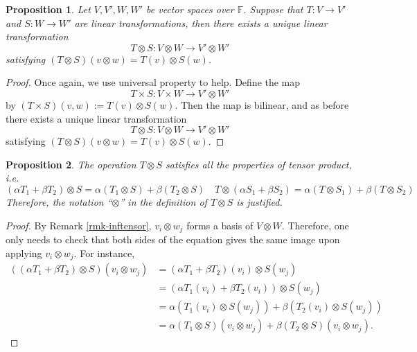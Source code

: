 \documentclass[11pt,openany]{book}
\theoremstyle{plain}
\newtheorem{proposition}[proposition]{Proposition}
\theoremstyle{definition}
\theoremstyle{remark}
\begin{document}
\begin{proposition} 
Let $V, V', W, W'$ be vector spaces over $\mathbb{F}$. Suppose that $T : V \to V'$ and $S : W \to W'$ are linear transformations, then there exists a unique linear transformation
$$T \otimes  S : V \otimes W \to V' \otimes W'$$
satisfying $(T \otimes  S)(v \otimes  w) = T(v) \otimes  S(w)$. 
\end{proposition}
\begin{proof} 
Once again, we use universal property to help. Define the map
$$T \times  S : V \times W \to V' \otimes W'$$
by $(T \times  S)(v,w) := T(v) \otimes  S(w)$.
Then the map is bilinear, and as before there exists a unique linear transformation
$$T \otimes S : V\otimes W \to V' \otimes W'$$
satisfying $(T \otimes  S)(v \otimes  w) = T(v) \otimes  S(w)$.
\end{proof}

\begin{proposition} The operation $T \otimes S$ satisfies all the properties of tensor product, i.e.
$$(\alpha T_1 + \beta T_2) \otimes  S = \alpha(T_1 \otimes  S) + \beta(T_2 \otimes  S) \quad  
T \otimes  (\alpha S_1 + \beta S_2) = \alpha(T \otimes  S_1) + \beta (T \otimes  S_2)$$
Therefore, the notation “$\otimes$” in the definition of $T \otimes  S$ is justified.
\end{proposition}
\begin{proof}
By Remark \ref{rmk-inftensor}, $v_i \otimes w_j$ forms a basis of $V \otimes W$. Therefore, one only needs to check that both sides of the equation gives the same image upon applying $v_i \otimes w_j$. For instance,
\begin{align*}
((\alpha T_1 + \beta T_2) \otimes  S)(v_i \otimes w_j) &= 
(\alpha T_1 + \beta T_2)(v_i) \otimes  S(w_j) \\
&= 
(\alpha T_1(v_i) + \beta T_2(v_i)) \otimes  S(w_j)\\
&= 
\alpha (T_1(v_i) \otimes  S(w_j)) + \beta (T_2(v_i) \otimes  S(w_j)) \\
&=
\alpha(T_1 \otimes  S)(v_i \otimes w_j) + \beta(T_2 \otimes  S)(v_i \otimes w_j).
\end{align*}

\end{proof}
\end{document}
